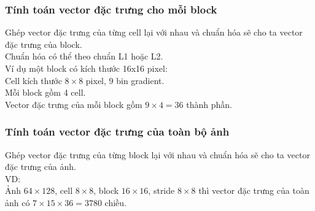 \documentclass[../report.tex]{subfiles}
\begin{document}
\subsubsection{Tính toán vector đặc trưng cho mỗi block}
Ghép vector đặc trưng của từng cell lại với nhau và 
chuẩn hóa sẽ cho ta vector đặc trưng của block. 
\\[3mm]
Chuẩn hóa có thể theo chuẩn L1 hoặc L2. 
\\[3mm]
Ví dụ một block có kích thước 16x16 pixel: \\
\tab Cell kích thước $8 \times 8$ pixel, 9 bin gradient. \\
\tab Mỗi block gồm 4 cell.  \\
\tab Vector đặc trưng của mỗi block gồm $9 \times 4 = 36$ thành phần.

\subsubsection{Tính toán vector đặc trưng của toàn bộ ảnh}
Ghép vector đặc trưng của từng block lại với nhau 
và chuẩn hóa sẽ cho ta vector đặc trưng của ảnh. 
\\[3mm]
VD:  \\
Ảnh $64 \times 128$, cell $8 \times 8$, 
block $16 \times 16$, stride $8 \times 8$ thì vector đặc trưng của toàn ảnh có 
$7 \times 15 \times 36=3780$ chiều. 
\end{document}
